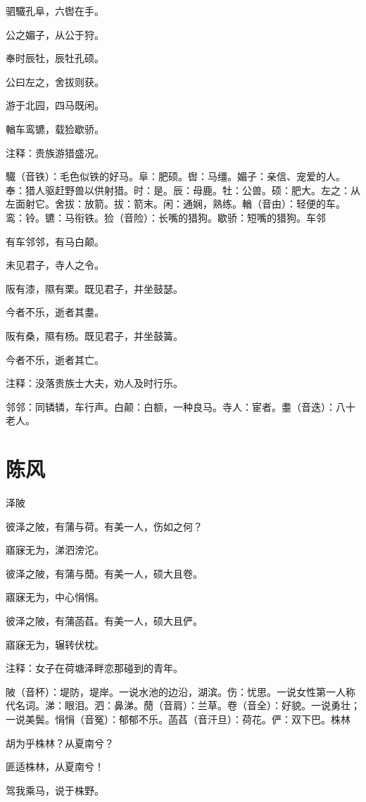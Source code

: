 \documentclass[12pt,UTF8]{ctexbook}
\begin{document}
驷驖孔阜，六辔在手。

公之媚子，从公于狩。

奉时辰牡，辰牡孔硕。

公曰左之，舍拔则获。

游于北园，四马既闲。

輶车鸾镳，载猃歇骄。

注释：贵族游猎盛况。

驖（音铁）：毛色似铁的好马。阜：肥硕。辔：马缰。媚子：亲信、宠爱的人。奉：猎人驱赶野兽以供射猎。时：是。辰：母鹿。牡：公兽。硕：肥大。左之：从左面射它。舍拔：放箭。拔：箭末。闲：通娴，熟练。輶（音由）：轻便的车。鸾：铃。镳：马衔铁。猃（音险）：长嘴的猎狗。歇骄：短嘴的猎狗。车邻

有车邻邻，有马白颠。

未见君子，寺人之令。

阪有漆，隰有栗。既见君子，并坐鼓瑟。

今者不乐，逝者其耋。

阪有桑，隰有杨。既见君子，并坐鼓簧。

今者不乐，逝者其亡。

注释：没落贵族士大夫，劝人及时行乐。

邻邻：同辚辚，车行声。白颠：白额，一种良马。寺人：宦者。耋（音迭）：八十老人。



\part{陈风}

泽陂

彼泽之陂，有蒲与荷。有美一人，伤如之何？

寤寐无为，涕泗滂沱。

彼泽之陂，有蒲与蕑。有美一人，硕大且卷。

寤寐无为，中心悁悁。

彼泽之陂，有蒲菡萏。有美一人，硕大且俨。

寤寐无为，辗转伏枕。

注释：女子在荷塘泽畔恋那碰到的青年。

陂（音杯）：堤防，堤岸。一说水池的边沿，湖滨。伤：忧思。一说女性第一人称代名词。涕：眼泪。泗：鼻涕。蕑（音肩）：兰草。卷（音全）：好貌。一说勇壮；一说美鬓。悁悁（音冤）：郁郁不乐。菡萏（音汗旦）：荷花。俨：双下巴。株林

胡为乎株林？从夏南兮？

匪适株林，从夏南兮！

驾我乘马，说于株野。
\end{document}

